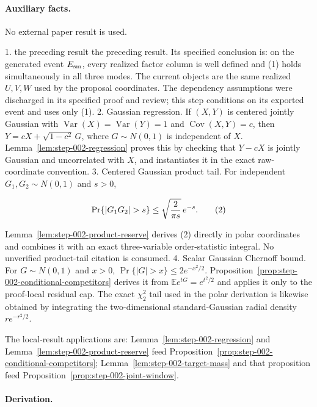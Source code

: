 \paragraph{Auxiliary facts.}

No external paper result is used.

1. the preceding result the preceding result. Its specified conclusion is: on the
   generated event $E_{\rm sm}$, every realized factor column is well
   defined and (1) holds simultaneously in all three modes. The current
   objects are the same realized $U,V,W$ used by the proposal coordinates.
   The dependency assumptions were discharged in its specified proof and
   review; this step conditions on its exported event and uses only (1).
2. Gaussian regression. If $(X,Y)$ is centered jointly Gaussian with
   $\operatorname{Var}(X)=\operatorname{Var}(Y)=1$ and
   $\operatorname{Cov}(X,Y)=c$, then
   $Y=cX+\sqrt{1-c^2}\,G$, where $G\sim N(0,1)$ is independent of $X$.
   Lemma~\ref{lem:step-002-regression} proves this by checking that
   $Y-cX$ is jointly Gaussian and uncorrelated with $X$, and instantiates it
   in the exact raw-coordinate convention.
3. Centered Gaussian product tail. For independent $G_1,G_2\sim N(0,1)$
   and $s>0$,

   \[
   \Pr\{|G_1G_2|>s\}
   \le \sqrt{2\over\pi s}\,e^{-s}.
   \tag{2}
   \]

   Lemma~\ref{lem:step-002-product-reserve} derives (2) directly in polar
   coordinates and combines it with an exact three-variable order-statistic
   integral. No unverified product-tail citation is consumed.
4. Scalar Gaussian Chernoff bound. For $G\sim N(0,1)$ and $x>0$,
   $\Pr\{|G|>x\}\le2e^{-x^2/2}$.
   Proposition~\ref{prop:step-002-conditional-competitors} derives it from
   $\mathbb E e^{tG}=e^{t^2/2}$ and applies it only to the proof-local
   residual cap. The exact $\chi^2_2$ tail used in the polar derivation is
   likewise obtained by integrating the two-dimensional standard-Gaussian
   radial density $re^{-r^2/2}$.

The local-result applications are: Lemma~\ref{lem:step-002-regression} and
Lemma~\ref{lem:step-002-product-reserve} feed
Proposition~\ref{prop:step-002-conditional-competitors};
Lemma~\ref{lem:step-002-target-mass} and that proposition feed
Proposition~\ref{prop:step-002-joint-window}.

\paragraph{Derivation.}

